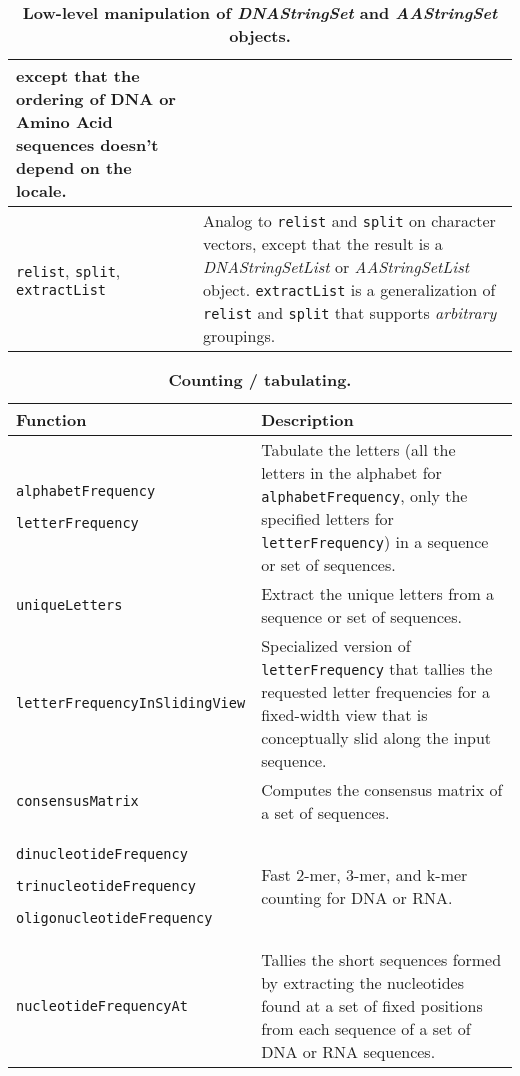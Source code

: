\documentclass[10pt]{article}
\newcommand{\Rfunction}[1]{\texttt{#1}}
\newcommand{\Rclass}[1]{{\textit{#1}}}
\begin{document}
\begin{table}[ht]
\begin{center}
\begin{tabular}{p{2.5in}|p{4in}}
    except that the ordering of DNA or Amino Acid sequences doesn't
    depend on the locale. \\
\hline
\Rfunction{relist}, \Rfunction{split}, \Rfunction{extractList} &
    Analog to \Rfunction{relist} and \Rfunction{split} on character vectors,
    except that the result is a \Rclass{DNAStringSetList} or
    \Rclass{AAStringSetList} object.
    \Rfunction{extractList} is a generalization of \Rfunction{relist} and
    \Rfunction{split} that supports \emph{arbitrary} groupings. \\
\hline
\end{tabular}
\end{center}
\caption{\bf Low-level manipulation of \Rclass{DNAStringSet} and
         \Rclass{AAStringSet} objects.}
\label{table:Low_level_manipulation}
\end{table}


\begin{table}[ht]
\begin{center}
\begin{tabular}{p{2.5in}|p{4in}}
{\bf Function} & {\bf Description} \\
\hline
\Rfunction{alphabetFrequency}\par
\Rfunction{letterFrequency} &
    Tabulate the letters (all the letters in the alphabet for
    \Rfunction{alphabetFrequency}, only the specified letters for
    \Rfunction{letterFrequency}) in a sequence or set of sequences. \\
\hline
\Rfunction{uniqueLetters} &
    Extract the unique letters from a sequence or set of sequences. \\
\hline
\Rfunction{letterFrequencyInSlidingView} &
    Specialized version of \Rfunction{letterFrequency} that tallies the
    requested letter frequencies for a fixed-width view that is conceptually
    slid along the input sequence. \\
\hline
\Rfunction{consensusMatrix} &
    Computes the consensus matrix of a set of sequences. \\
\hline
\Rfunction{dinucleotideFrequency}\par
\Rfunction{trinucleotideFrequency}\par
\Rfunction{oligonucleotideFrequency} &
    Fast 2-mer, 3-mer, and k-mer counting for DNA or RNA. \\
\hline
\Rfunction{nucleotideFrequencyAt} &
    Tallies the short sequences formed by extracting the nucleotides found
    at a set of fixed positions from each sequence of a set of DNA or RNA
    sequences. \\
\hline
\end{tabular}
\end{center}
\caption{\bf Counting / tabulating.}
\label{table:Counting_tabulating}
\end{table}
\end{document}
